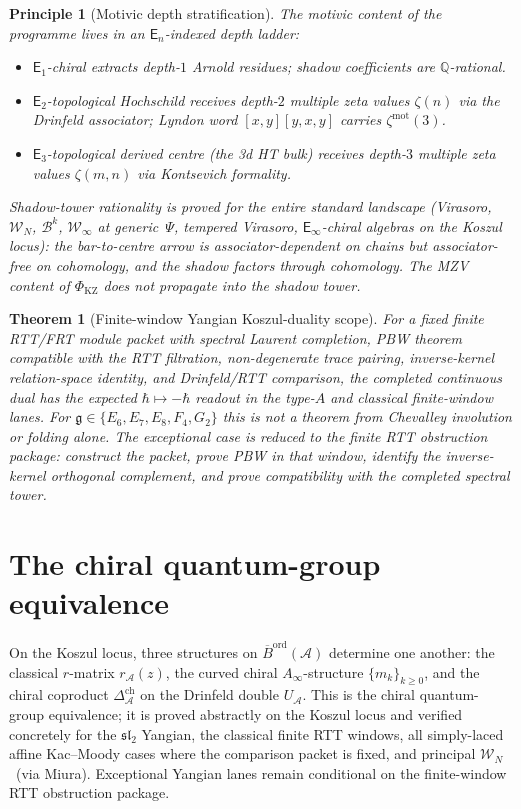 \documentclass[11pt]{article}
\providecommand{\cA}{\mathcal{A}}
\providecommand{\cW}{\mathcal{W}}
\providecommand{\bQ}{\mathbb{Q}}
\providecommand{\fg}{\mathfrak{g}}
\providecommand{\barB}{\overline{B}}
\providecommand{\Eone}{\mathsf{E}_{1}}
\providecommand{\Etwo}{\mathsf{E}_{2}}
\providecommand{\Ethree}{\mathsf{E}_{3}}
\providecommand{\Einf}{\mathsf{E}_{\infty}}
\providecommand{\En}{\mathsf{E}_{n}}
\newtheorem{theorem}{Theorem}[section]
\newtheorem*{principle}{Principle}
\begin{document}
\begin{principle}[Motivic depth stratification]
The motivic content of the programme lives in an $\En$-indexed
depth ladder:
\begin{itemize}[nosep]
\item $\Eone$-chiral extracts depth-$1$ Arnold residues; shadow
coefficients are $\bQ$-rational.
\item $\Etwo$-topological Hochschild receives depth-$2$ multiple
zeta values $\zeta(n)$ via the Drinfeld associator; Lyndon word
$[x,y][y,x,y]$ carries $\zeta^{\mathrm{mot}}(3)$.
\item $\Ethree$-topological derived centre (the 3d HT bulk) receives
depth-$3$ multiple zeta values $\zeta(m,n)$ via Kontsevich
formality.
\end{itemize}
Shadow-tower rationality is proved for the entire standard landscape
\textup{(}Virasoro, $\cW_N$, $\mathcal{B}^k$, $\cW_\infty$ at
generic~$\Psi$, tempered Virasoro, $\Einf$-chiral algebras on the
Koszul locus\textup{)}: the bar-to-centre arrow is
associator-dependent on chains but associator-free on cohomology,
and the shadow factors through cohomology. The MZV content of
$\Phi_{\mathrm{KZ}}$ does not propagate into the shadow tower.
\end{principle}

\begin{theorem}[Finite-window Yangian Koszul-duality scope]
For a fixed finite RTT/FRT module packet with spectral Laurent
completion, PBW theorem compatible with the RTT filtration,
non-degenerate trace pairing, inverse-kernel relation-space identity,
and Drinfeld/RTT comparison, the completed continuous dual has the
expected $\hbar\mapsto-\hbar$ readout in the type-$A$ and classical
finite-window lanes. For
$\fg\in\{E_6,E_7,E_8,F_4,G_2\}$ this is not a theorem from Chevalley
involution or folding alone. The exceptional case is reduced to the
finite RTT obstruction package: construct the packet, prove PBW in that
window, identify the inverse-kernel orthogonal complement, and prove
compatibility with the completed spectral tower.
\end{theorem}

\section{The chiral quantum-group equivalence}

\noindent
On the Koszul locus, three structures on $\barB^{\mathrm{ord}}(\cA)$
determine one another: the classical $r$-matrix $r_\cA(z)$, the
curved chiral $A_\infty$-structure $\{m_k\}_{k\ge 0}$, and the
chiral coproduct $\Delta^{\mathrm{ch}}_\cA$ on the Drinfeld double
$U_\cA$. This is the chiral quantum-group equivalence; it is proved
abstractly on the Koszul locus and verified concretely for the
$\mathfrak{sl}_2$ Yangian, the classical finite RTT windows, all
simply-laced affine Kac--Moody cases where the comparison packet is
fixed, and principal $\cW_N$~\textup{(via Miura)}. Exceptional Yangian
lanes remain conditional on the finite-window RTT obstruction package.
\end{document}
